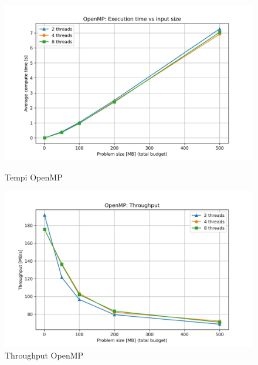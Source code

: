 			\begin{figure}[H]
				\centering
				\begin{minipage}[t]{0.49\textwidth}
					\centering
					\includegraphics[width=\textwidth]{img/omp_plots/omp_times.jpg}
					\caption{Tempi OpenMP}
					\label{fig:omp_times}
				\end{minipage}
				\hfill
				\begin{minipage}[t]{0.49\textwidth}
					\centering
					\includegraphics[width=\textwidth]{img/omp_plots/omp_throughput.jpg}
					\caption{Throughput OpenMP}
					\label{fig:omp_throughput}
				\end{minipage}
			\end{figure}
			
